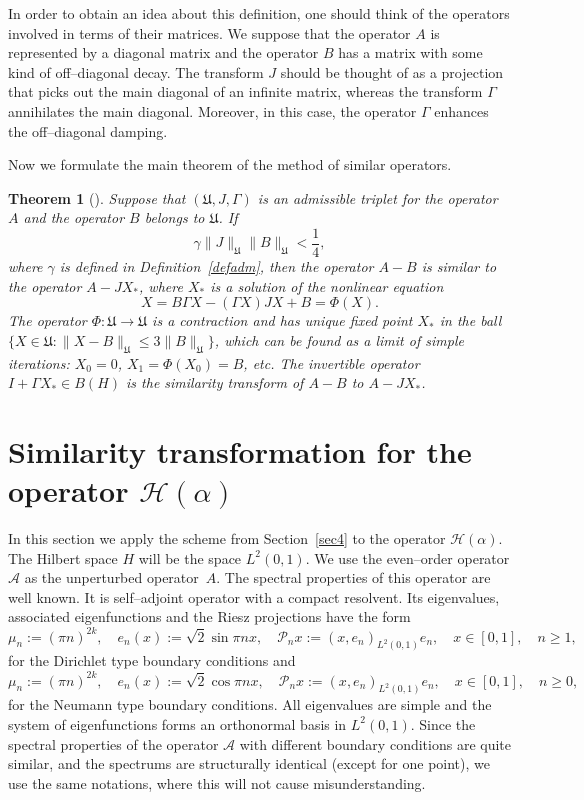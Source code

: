 \documentclass[11pt,centertags,reqno,twoside]{amsart}
\numberwithin{equation}{section}
\newtheorem{theorem}{Theorem}
\theoremstyle{definition}
\theoremstyle{remark}
\begin{document}
In order to obtain an idea about this definition, one should think of the operators
involved in terms of their matrices. We suppose that the operator $A$ is represented
by a diagonal matrix and the operator $B$ has a matrix with some kind of off--diagonal
decay. The transform $J$ should be thought of as a projection that picks out the
main diagonal of an infinite matrix, whereas the transform $\Gamma$ annihilates the main
diagonal. Moreover, in this case, the operator $\Gamma$ enhances the off--diagonal damping.

Now we formulate the main theorem of the method of similar operators.
\begin{theorem}[\cite{BaskKrUsk}]\label{thsimgen}
Suppose that $(\mathfrak{U}, J, \Gamma)$ is an admissible triplet for the operator $A$
and the operator $B$ belongs to $\mathfrak{U}$. If
\begin{equation}\label{mainest}
\gamma\|J\|_{\mathfrak{U}}\|B\|_{\mathfrak{U}}<\frac{1}{4},
\end{equation}
where $\gamma$ is defined in Definition~\ref{defadm}, then the operator $A-B$ is similar
to the operator $A-JX_*$, where $X_*$ is a solution of the nonlinear equation
\[
X=B\Gamma X-(\Gamma X)JX+B=\Phi(X).
\]
The operator $\Phi: \mathfrak{U}\to\mathfrak{U}$ is a contraction and has unique
fixed point $X_*$ in the ball
$\{X\in\mathfrak{U}: \|X-B\|_{\mathfrak{U}}\leqslant 3\|B\|_{\mathfrak{U}}\}$,
which can be found as a limit of simple iterations: $X_0=0$, $X_1=\Phi(X_0)=B$, etc.
The invertible operator $I+\Gamma X_*\in B(H)$ is the similarity transform
of $A-B$ to $A-JX_*$.
\end{theorem}

\section{Similarity transformation for the operator $\mathcal{H}(\alpha)$}
In this section we apply the scheme from Section~\ref{sec4} to the operator
$\mathcal{H}(\alpha)$. The Hilbert space $H$ will be the space $L^2(0, 1)$.
We use the even--order operator $\mathcal{A}$ as the
unperturbed operator~$A$. The spectral properties of this operator are well known. It is
self--adjoint operator with a compact resolvent. Its eigenvalues, associated
eigenfunctions and the Riesz projections have the form
\begin{equation}\label{2.0}
\mu_n:=(\pi n)^{2k},\quad e_n(x):=\sqrt{2}\sin\pi n x,
\quad \mathcal{P}_nx:= (x, e_n)_{L^2(0, 1)}e_n, \quad x\in [0, 1], \quad n\geqslant 1,
\end{equation}
for the Dirichlet type boundary conditions and
\begin{equation}\label{3.0}
\mu_n:=(\pi n)^{2k},\quad e_n(x):=\sqrt{2}\cos\pi nx,
\quad \mathcal{P}_nx:= (x, e_n)_{L^2(0, 1)}e_n, \quad x\in [0, 1],\quad
n\geqslant 0,
\end{equation}
for the Neumann type boundary conditions. All eigenvalues are simple and
the system of eigenfunctions forms an orthonormal basis in $L^2(0, 1)$. Since the
spectral properties of the operator $\mathcal{A}$ with different boundary conditions
are quite similar, and the spectrums are structurally identical (except for one point),
we use the same notations, where this will not cause misunderstanding.
\end{document}
